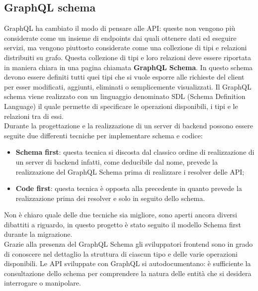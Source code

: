 \subsection{GraphQL schema}
GraphQL ha cambiato il modo di pensare alle API: queste non vengono più considerate come un insieme di endpoints dai quali ottenere dati ed eseguire servizi, ma vengono piuttosto considerate come una collezione di tipi e relazioni distribuiti su grafo. Questa collezione di tipi e loro relazioni deve essere riportata in maniera chiara in una pagina chiamata \textbf{GraphQL Schema}. In questo schema devono essere definiti tutti quei tipi che si vuole esporre alle richieste del client per esser modificati, aggiunti, eliminati o semplicemente visualizzati. Il GraphQL schema viene realizzato con un linguaggio denominato SDL (Schema Definition Language) il quale permette di specificare le operazioni disponibili, i tipi e le relazioni tra di essi.\\
Durante la progettazione e la realizzazione di un server di backend possono essere seguite due differenti tecniche per implementare schema e codice:
\begin{itemize}
  \item \textbf{Schema first}: questa tecnica si discosta dal classico ordine di realizzazione di un server di backend infatti, come deducibile dal nome, prevede la realizzazione del GraphQL Schema prima di realizzare i resolver delle API;
  \item \textbf{Code first}: questa tecnica è opposta alla precedente in quanto prevede la realizzazione prima dei resolver e solo in seguito dello schema.
\end{itemize}
Non è chiaro quale delle due tecniche sia migliore, sono aperti ancora diversi dibattiti a riguardo, in questo progetto è stato seguito il modello Schema first durante la migrazione.\\
Grazie alla presenza del GraphQL Schema gli sviluppatori frontend sono in grado di conoscere nel dettaglio la struttura di ciascun tipo e delle varie operazioni disponibili. Le API sviluppate con GraphQL si autodocumentano: è sufficiente la consultazione dello schema per comprendere la natura delle entità che si desidera interrogare o manipolare.
